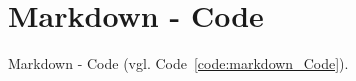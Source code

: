 \section{Markdown - Code}\label{sec:Markdown_Code}



Markdown - Code (vgl. Code~\ref{code:markdown_Code}).%
